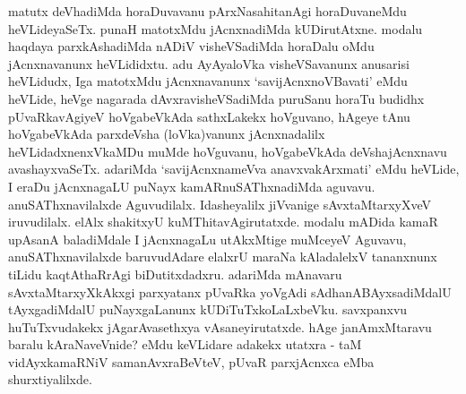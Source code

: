 
\begin{artha}
matutx deVhadiMda horaDuvavanu pArxNasahitanAgi horaDuvaneMdu heVLideyaSeTx. punaH matotxMdu jAcnxnadiMda kUDirutAtxne. modalu haqdaya parxkAshadiMda nADiV visheVSadiMda horaDalu oMdu jAcnxnavanunx heVLididxtu. adu AyAyaloVka visheVSavanunx anusarisi heVLidudx, Iga matotxMdu jAcnxnavanunx `savijAcnxnoVBavati' eMdu heVLide, heVge nagarada dAvxravisheVSadiMda puruSanu horaTu budidhx pUvaRkavAgiyeV hoVgabeVkAda sathxLakekx hoVguvano, hAgeye tAnu hoVgabeVkAda parxdeVsha (loVka)vanunx jAcnxnadalilx heVLidadxnenxVkaMDu muMde hoVguvanu, hoVgabeVkAda deVshajAcnxnavu avashayxvaSeTx. adariMda `savijAcnxnameVva anavxvakArxmati' eMdu heVLide, I eraDu jAcnxnagaLU puNayx kamARnuSAThxnadiMda aguvavu. anuSAThxnavilalxde Aguvudilalx. Idasheyalilx jiVvanige sAvxtaMtarxyXveV iruvudilalx. elAlx shakitxyU kuMThitavAgirutatxde. modalu mADida kamaR upAsanA baladiMdale I jAcnxnagaLu utAkxMtige muMceyeV Aguvavu, anuSAThxnavilalxde baruvudAdare elalxrU maraNa kAladalelxV tananxnunx tiLidu kaqtAthaRrAgi biDutitxdadxru. adariMda mAnavaru sAvxtaMtarxyXkAkxgi parxyatanx pUvaRka yoVgAdi sAdhanABAyxsadiMdalU tAyxgadiMdalU puNayxgaLanunx kUDiTuTxkoLaLxbeVku. savxpanxvu huTuTxvudakekx jAgarAvasethxya vAsaneyirutatxde. hAge janAmxMtaravu baralu kAraNaveVnide? eMdu keVLidare adakekx utatxra - taM vidAyxkamaRNiV samanAvxraBeVteV, pUvaR parxjAcnxca eMba shurxtiyalilxde. 
\end{artha}


